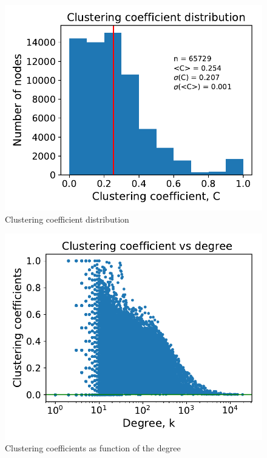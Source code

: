 \documentclass[11pt, twoside]{report}
\begin{document}
\begin{minipage}[b]{0.5\textwidth}
   \centering
    \begin{figure}[H]
      \includegraphics[width=\textwidth]{../../scripts/network_analysis/imgs/cluster_coef_hist.pdf}            
          \caption{Clustering coefficient distribution}
      \label{fig:clust_distrib}
\end{figure}
\end{minipage}
\begin{minipage}[b]{0.5\textwidth}
  \begin{figure}[H]
  \centering
      \includegraphics[width=\textwidth]{../../scripts/network_analysis/imgs/cluster_coef_bydegree.pdf}            
      \caption{Clustering coefficients as function of the degree}
\end{figure}
\end{minipage}
\end{document}
